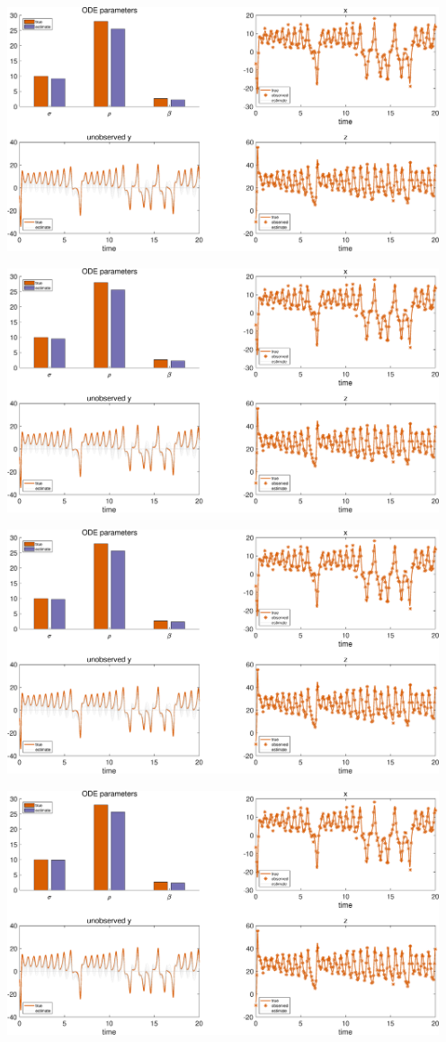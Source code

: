 {\includegraphics [width=5in]{Lorenz_attractor_4_12.eps}

\includegraphics [width=5in]{Lorenz_attractor_4_13.eps}

\includegraphics [width=5in]{Lorenz_attractor_4_14.eps}

\includegraphics [width=5in]{Lorenz_attractor_4_15.eps}

}
